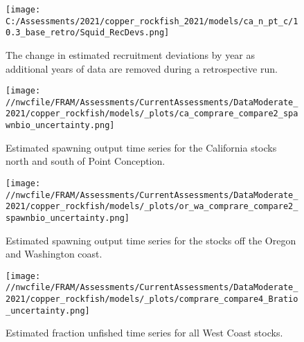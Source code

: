 \documentclass[11pt,
  english,
  a4paper,
]{article}
\begin{document}
\begin{figure}
\centering
\texttt{[image: C:/Assessments/2021/copper\_rockfish\_2021/models/ca\_n\_pt\_c/10.3\_base\_retro/Squid\_RecDevs.png]}
\caption{The change in estimated recruitment deviations by year as additional years of data are removed during a retrospective run.\label{fig:retro-squid}}
\end{figure}

\tagmcend\tagstructend

\newpage


\begin{figure}
\centering
\texttt{[image: //nwcfile/FRAM/Assessments/CurrentAssessments/DataModerate\_2021/copper\_rockfish/models/\_plots/ca\_comprare\_compare2\_spawnbio\_uncertainty.png]}
\caption{Estimated spawning output time series for the California stocks north and south of Point Conception.\label{fig:ssb-ca-compare}}
\end{figure}

\tagmcend\tagstructend


\begin{figure}
\centering
\texttt{[image: //nwcfile/FRAM/Assessments/CurrentAssessments/DataModerate\_2021/copper\_rockfish/models/\_plots/or\_wa\_comprare\_compare2\_spawnbio\_uncertainty.png]}
\caption{Estimated spawning output time series for the stocks off the Oregon and Washington coast.\label{fig:ssb-orwa-compare}}
\end{figure}

\tagmcend\tagstructend


\begin{figure}
\centering
\texttt{[image: //nwcfile/FRAM/Assessments/CurrentAssessments/DataModerate\_2021/copper\_rockfish/models/\_plots/comprare\_compare4\_Bratio\_uncertainty.png]}
\caption{Estimated fraction unfished time series for all West Coast stocks.\label{fig:depl-compare}}
\end{figure}
\end{document}
